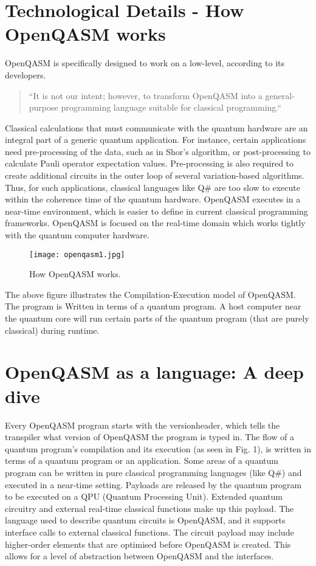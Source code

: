 \documentclass[conference]{IEEEtran}
\begin{document}
\section{\textbf{Technological Details - How OpenQASM works}}
OpenQASM is specifically designed to work on a low-level, according to its developers. 
\begin{quote}
    ``It is not our intent; however, to transform OpenQASM into a general-purpose programming language suitable for classical programming.`` \cite{b3}
\end{quote}

Classical calculations that must communicate with the quantum hardware are an integral part of a generic quantum application. For instance, certain applications need pre-processing of the data, such as in Shor's algorithm, or post-processing to calculate Pauli operator expectation values. Pre-processing is also required to create additional circuits in the outer loop of several variation-based algorithms. Thus, for such applications, classical languages like Q# are too slow to execute within the coherence time of the quantum hardware. OpenQASM executes in a near-time environment, which is easier to define in current classical programming frameworks. OpenQASM is focused on the real-time domain which works tightly with the quantum computer hardware. 

\begin{figure}[H]
\centering
\centerline{\texttt{[image: openqasm1.jpg]}}
\caption{How OpenQASM works. \cite{b1}}\label{}
\end{figure}

The above figure illustrates the Compilation-Execution model of OpenQASM. The program is Written in terms of a quantum program. A host computer near the quantum core will run certain parts of the quantum program (that are purely classical) during runtime.

\section*{\textbf{OpenQASM as a language: A deep dive}}
Every OpenQASM program starts with the versionheader, which tells the transpiler what version of OpenQASM the program is typed in. The flow of a quantum program's compilation and its execution (as seen in Fig. 1), is written in terms of a quantum program or an application. Some areas of a quantum program can be written in pure classical programming languages (like Q#) and executed in a near-time setting. Payloads are released by the quantum program to be executed on a QPU (Quantum Processing Unit). Extended quantum circuitry and external real-time classical functions make up this payload. The language used to describe quantum circuits is OpenQASM, and it supports interface calls to external classical functions. The circuit payload may include higher-order elements that are optimised before OpenQASM is created. This allows for a level of abstraction between OpenQASM and the interfaces. 
\end{document}
